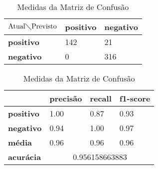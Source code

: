 \begin{table}[h!]
\centering
\begin{minipage}[b]{0.45\linewidth}
\caption{Matriz de Confusão Binária: \textit{Naïve Bayes}}
\label{tab:mcb-nb}
\begin{tabular}{|l|l|l|}
\hline
$\textrm{Atual}\diagdown\textrm{Previsto}$ & \textbf{positivo} & \textbf{negativo} \\ \hline
\textbf{positivo}     & 142                 & 21   \\ \hline
\textbf{negativo}     & 0                   & 316 \\ \hline
\end{tabular}
\end{minipage}
\hspace{0.5cm}
\begin{minipage}[b]{0.45\linewidth}

\centering
\caption{Medidas da Matriz de Confusão}
\label{tab:mmcb-nb}
\begin{tabular}{|l|l|l|l|}
\hline
         & \textbf{precisão} & \textbf{recall} & \textbf{f1-score} \\ \hline
\textbf{positivo} & 1.00     & 0.87   & 0.93     \\ \hline
\textbf{negativo} & 0.94     & 1.00   & 0.97     \\ \hline
\textbf{média}    & 0.96     & 0.96   & 0.96 \\ \hline
\textbf{acurácia} & \multicolumn{3}{|c|}{0.956158663883} \\ \hline
\end{tabular}
\end{minipage}
\end{table}


